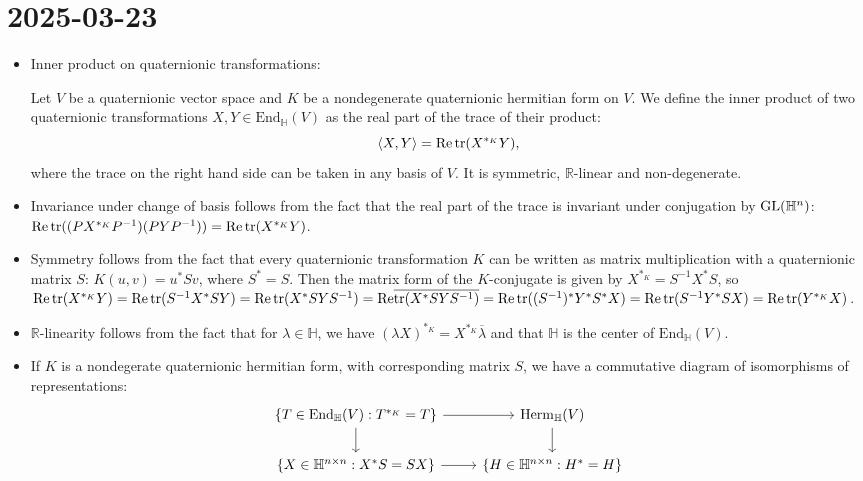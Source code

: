 \documentclass{report}
\begin{document}
\section{2025-03-23}
\begin{itemize}
    \item Inner product on quaternionic transformations:
    \begin{definition}
        Let $V$ be a quaternionic vector space and $K$ be a nondegenerate quaternionic hermitian form on $V$.
        We define the inner product of two quaternionic transformations $X, Y \in \mathrm{End}_\mathbb H(V)$ as the real part of the trace of their product:
        \[
        \langle X, Y \rangle = \mathrm{Re}\operatorname{tr}(X^{*_K} Y),
        \]
        where the trace on the right hand side can be taken in any basis of $V$.
        It is symmetric, $\mathbb R$-linear and non-degenerate.
    \end{definition}
    \item Invariance under change of basis follows from the fact that the real part of the trace is invariant under conjugation by $\operatorname{{\mathrm{GL}}}(\mathbb H^n)$:
    $\mathrm{Re}\operatorname{tr}((P X^{*_K} P^{-1}) (PYP^{-1})) = \mathrm{Re}\operatorname{tr}(X^{*_K} Y)$.
    \item Symmetry follows from the fact that every quaternionic transformation $K$ can be written as matrix multiplication with a quaternionic matrix $S$: $K(u,v) = u^* S v$, where $S^* = S$.
    Then the matrix form of the $K$-conjugate is given by $X^{*_K} = S^{-1} X^* S$, so $\mathrm{Re}\operatorname{tr}(X^{*_K} Y) = \mathrm{Re}\operatorname{tr}(S^{-1} X^* S Y) = \mathrm{Re}\operatorname{tr}(X^* S Y S^{-1}) = \mathrm{Re}\overline{\operatorname{tr}(X^* S Y S^{-1})} = \mathrm{Re}\operatorname{tr}((S^{-1})^* Y^* S^* X) = \mathrm{Re}\operatorname{tr}(S^{-1} Y^* S X) = \mathrm{Re}\operatorname{tr}(Y^{*_K} X)$.
    \item $\mathbb R$-linearity follows from the fact that for $\lambda \in \mathbb H$, we have $(\lambda X)^{*_{K}} = X^{*_K} \overline \lambda$ and that $\mathbb H$ is the center of $\mathrm{End}_\mathbb H(V)$.
    \item If $K$ is a nondegerate quaternionic hermitian form, with corresponding matrix $S$, we have a commutative diagram of isomorphisms of representations:
    \[
    \begin{tikzcd}\label{diag:action_hermitian}
        \left\{ T \in \mathrm{End}_\mathbb H(V) : T^{*_K} = T \right\} \arrow[r] \arrow[d] & \mathrm{Herm}_\mathbb H(V) \arrow[d] \\
        \{ X \in \mathbb H^{n\times n} : X^* S = SX\} \arrow[r] & \left\{ H \in \mathbb H^{n\times n} : H^* = H \right\}

\end{tikzcd}\]
\end{itemize}
\end{document}
